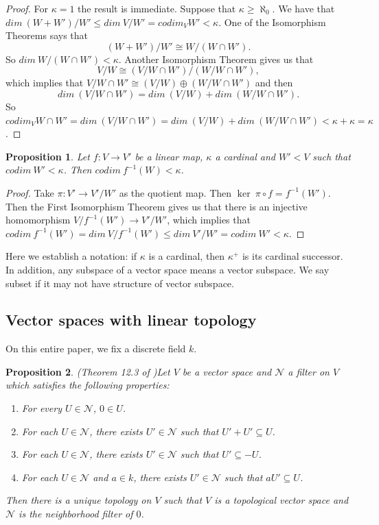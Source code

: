\documentclass[a4paper,12pt]{article}
\newtheorem{prop}{Proposition}[section]
\theoremstyle{bloco}
\begin{document}
\begin{proof}For $\kappa = 1$ the result is immediate. Suppose that $\kappa \geqslant \aleph_{0}$. We have that $dim \ (W+W')/W' \leqslant dim \ V/W' = codim_{V}W' < \kappa$. One of the Isomorphism Theorems says that $$(W+W')/W' \cong W/(W\cap W').$$ So $dim \ W/(W\cap W') < \kappa$. Another Isomorphism Theorem gives us that $$V/W \cong (V/W\cap W')/(W/W\cap W'),$$ which implies that $V/W\cap W' \cong (V/W) \oplus (W/W\cap W')$ and then $$dim \ (V/W\cap W') = dim \ (V/W) + dim \ (W/W\cap W').$$ So $codim_{V} W\cap W' = dim \ (V/W\cap W')  = dim \ (V/W) + dim \ (W/W\cap W') < \kappa + \kappa = \kappa$.
\end{proof}

\begin{prop}\label{preimagesandcodimension}Let $f: V \rightarrow V'$ be a linear map, $\kappa$ a cardinal and $W' < V$ such that $codim \ W' < \kappa$. Then $codim \ f^{-1}(W) < \kappa$. 
\end{prop}

\begin{proof}Take $\pi: V' \rightarrow V'/W'$ as the quotient map. Then $\ker \ \pi \circ f = f^{-1}(W')$. Then the First Isomorphism Theorem gives us that there is an injective homomorphism $V/f^{-1}(W') \rightarrow V'/W'$, which implies that $codim \ f^{-1}(W') = dim \ V/f^{-1}(W') \leqslant dim \ V'/W' = codim \ W' < \kappa$.
\end{proof}

Here we establish a notation: if $\kappa$ is a cardinal, then $\kappa^{+}$ is its cardinal successor. In addition, any subspace of a vector space means a vector subspace. We say subset if it may not have structure of vector subspace.

\subsection{Vector spaces with linear topology}

On this entire paper, we fix a discrete field $k$.

\begin{prop}(Theorem 12.3 of \cite{Wa})Let $V$ be a vector space and $\mathcal{N}$ a filter on $V$ which satisfies the following properties:

\begin{enumerate}
    \item For every $U \in \mathcal{N}$, $0 \in U$.
    \item For each $U \in \mathcal{N}$, there exists $U' \in \mathcal{N}$ such that $U'+U' \subseteq U$.
    \item For each $U \in \mathcal{N}$, there exists $U' \in \mathcal{N}$ such that $U' \subseteq - U$.
    \item For each $U \in \mathcal{N}$ and $a \in k$, there exists $U' \in \mathcal{N}$ such that $aU' \subseteq U$.
\end{enumerate}

Then there is a unique topology on $V$ such that $V$ is a topological vector space and $\mathcal{N}$ is the neighborhood filter of $0$.
\end{prop}
\end{document}
